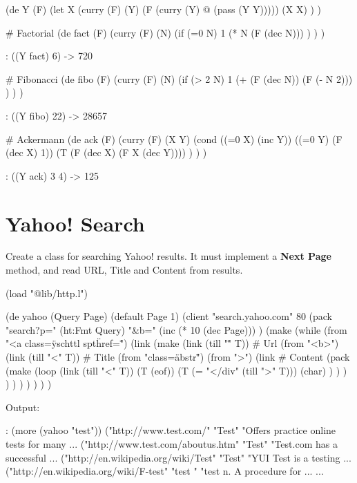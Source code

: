 \begin{wideverbatim}

(de Y (F)
   (let X (curry (F) (Y) (F (curry (Y) @ (pass (Y Y)))))
      (X X) ) )

# Factorial
(de fact (F)
   (curry (F) (N)
      (if (=0 N)
         1
         (* N (F (dec N))) ) ) )

: ((Y fact) 6)
-> 720

# Fibonacci
(de fibo (F)
   (curry (F) (N)
      (if (> 2 N)
         1
         (+ (F (dec N)) (F (- N 2))) ) ) )

: ((Y fibo) 22)
-> 28657

# Ackermann
(de ack (F)
   (curry (F) (X Y)
      (cond
         ((=0 X) (inc Y))
         ((=0 Y) (F (dec X) 1))
         (T (F (dec X) (F X (dec Y)))) ) ) )

: ((Y ack) 3 4)
-> 125

\end{wideverbatim}

\pagebreak{}
\section*{Yahoo! Search}

Create a class for searching Yahoo! results. It must implement a
\textbf{Next Page} method, and read URL, Title and Content from results.

\begin{wideverbatim}

(load "@lib/http.l")

(de yahoo (Query Page)
   (default Page 1)
   (client "search.yahoo.com" 80
      (pack
         "search?p=" (ht:Fmt Query)
         "\&b=" (inc (* 10 (dec Page))) )
      (make
         (while (from "<a class=\"yschttl spt\" href=\"")
            (link
               (make
                  (link (till "\"" T))       # Url
                  (from "<b>")
                  (link (till "<" T))        # Title
                  (from "class=\"abstr\"")
                  (from ">")
                  (link                      # Content
                     (pack
                        (make
                           (loop
                              (link (till "<" T))
                              (T (eof))
                              (T (= "</div" (till ">" T)))
                              (char) ) ) ) ) ) ) ) ) ) )

Output:

: (more (yahoo "test"))
("http://www.test.com/" "Test" "Offers practice online tests for many ...
("http://www.test.com/aboutus.htm" "Test" "Test.com has a successful ...
("http://en.wikipedia.org/wiki/Test" "Test" "YUI Test is a testing ...
("http://en.wikipedia.org/wiki/F-test" "test " "test n. A procedure for ...
...

\end{wideverbatim}

